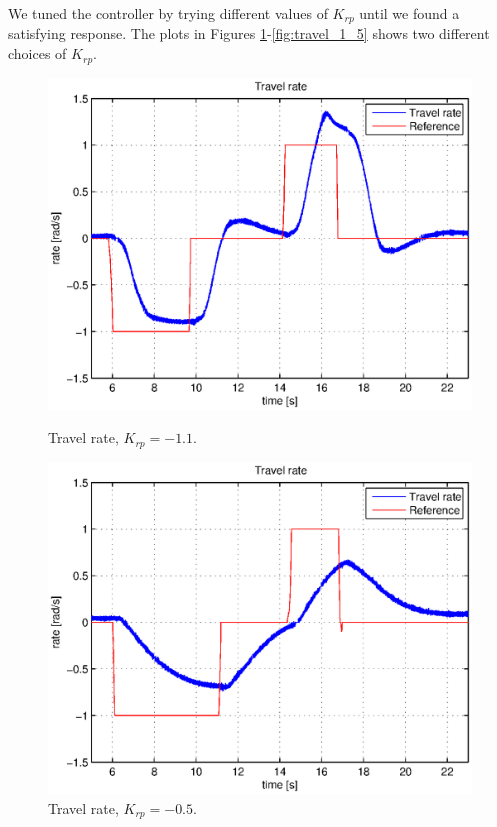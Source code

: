 We tuned the controller by trying different values of $K_{rp}$ until we found a satisfying response. The plots in Figures \ref{fig:travel_1_1}-\ref{fig:travel_1_5} shows two different choices of $K_{rp}$.
\begin{figure}[htb]
	\hspace{-2.7cm}
	\begin{minipage}{.5\textwidth}
	    \centering
		\includegraphics[width=0.9\linewidth]{plots/part2new/travel_rate_1_1.eps}
	    \caption{Travel rate, $K_{rp} = -1.1$.}
        \label{fig:travel_1_1}
    \end{minipage}%
    \begin{minipage}{.5\textwidth}
        \centering
		\includegraphics[width=0.9\linewidth]{plots/part2new/travel_rate_0_5.eps}
	    \caption{Travel rate, $K_{rp} = -0.5$.}

\end{minipage}
\end{figure}
